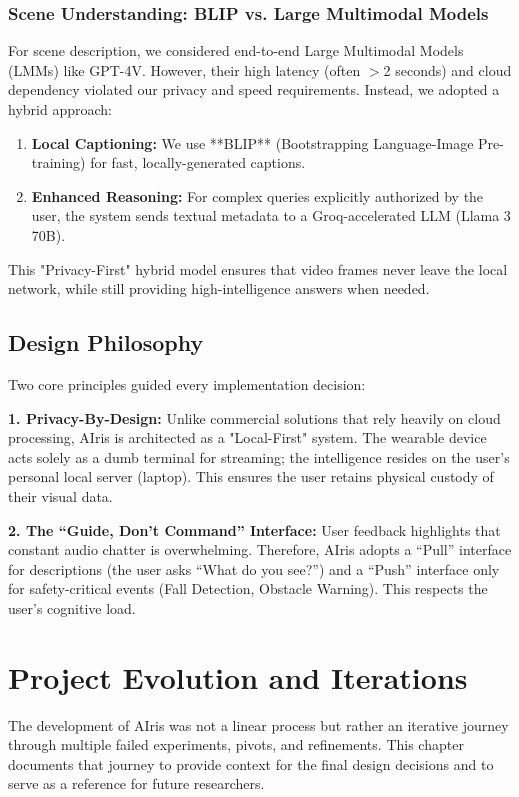 \documentclass[12pt,a4paper]{report}
\begin{document}
\subsection{Scene Understanding: BLIP vs. Large Multimodal Models}
For scene description, we considered end-to-end Large Multimodal Models (LMMs) like GPT-4V. However, their high latency (often $>$2 seconds) and cloud dependency violated our privacy and speed requirements. Instead, we adopted a hybrid approach:
\begin{enumerate}
    \item \textbf{Local Captioning:} We use **BLIP** (Bootstrapping Language-Image Pre-training) for fast, locally-generated captions.
    \item \textbf{Enhanced Reasoning:} For complex queries explicitly authorized by the user, the system sends textual metadata to a Groq-accelerated LLM (Llama 3 70B).
\end{enumerate}
This "Privacy-First" hybrid model ensures that video frames never leave the local network, while still providing high-intelligence answers when needed.

\section{Design Philosophy}

Two core principles guided every implementation decision:

\textbf{1. Privacy-By-Design:}
Unlike commercial solutions that rely heavily on cloud processing, AIris is architected as a "Local-First" system. The wearable device acts solely as a dumb terminal for streaming; the intelligence resides on the user's personal local server (laptop). This ensures the user retains physical custody of their visual data.

\textbf{2. The ``Guide, Don't Command'' Interface:}
User feedback highlights that constant audio chatter is overwhelming. Therefore, AIris adopts a ``Pull'' interface for descriptions (the user asks ``What do you see?'') and a ``Push'' interface only for safety-critical events (Fall Detection, Obstacle Warning). This respects the user's cognitive load.


\chapter{Project Evolution and Iterations}

The development of AIris was not a linear process but rather an iterative journey through multiple failed experiments, pivots, and refinements. This chapter documents that journey to provide context for the final design decisions and to serve as a reference for future researchers.
\end{document}
